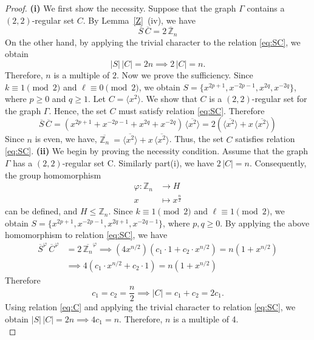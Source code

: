 \documentclass[12pt]{article}
\begin{document}
	\begin{proof}
	 \textbf{(i)} We first show the necessity. Suppose that the graph $\Gamma$ contains a $(2,2)$-regular set $C$. By Lemma~\ref{Z}~(iv), we have
		\begin{equation}\label{eq:SC}
			\overline{S}\, \overline{C} = 2\,\overline{\mathbb{Z}}_n
		\end{equation}
		On the other hand, by applying the trivial character to the relation \eqref{eq:SC}, we obtain
\[
|S|\,|C| = 2n \implies 2\,|C| = n.
\]
Therefore, $n$ is a multiple of $2$. Now we prove the sufficiency. Since
$k \equiv 1 \pmod{2}$ and $\ell \equiv 0 \pmod{2}$, we obtain
$S=\{x^{2p+1},x^{-2p-1},x^{2q},x^{-2q}\}$, where $p \ge 0$ and $q \ge 1$.
Let $C=\langle x^{2}\rangle$. We show that $C$ is a $(2,2)$-regular set for
the graph $\Gamma$. Hence, the set $C$ must satisfy relation \ref{eq:SC}. Therefore
\[
\overline{S}\,\overline{C}
= (x^{2p+1}+x^{-2p-1}+x^{2q}+x^{-2q})\,\overline{\langle x^{2}\rangle}
= 2(\overline{\langle x^{2}\rangle} + x\,\overline{\langle x^{2}\rangle})
\]
Since $n$ is even, we have, $\overline{\mathbb{Z}_n} \ = \overline{\langle x^2 \rangle} + x\,\overline{\langle x^2 \rangle}$. Thus, the set $C$ satisfies relation \eqref{eq:SC}.
 \indent\textbf{(ii)} We begin by proving the necessity condition. Assume that the graph $\Gamma$ has a $(2,2)$-regular set C. Similarly part(i), we have $2\,|C| = n$. Consequently, the group homomorphism
\[
\begin{aligned}
	\varphi : \mathbb{Z}_n &\to H \\
	x &\mapsto x^{\frac{n}{2}}
\end{aligned}
\]
can be defined, and $H \leq \mathbb{Z}_n$. Since
$k \equiv 1 \pmod{2}$ and $\ell \equiv 1 \pmod{2}$, we obtain
$S=\{x^{2p+1},x^{-2p-1},x^{2q+1},x^{-2q-1}\}$, where $p, q \ge 0$. By applying the above homomorphism to relation \eqref{eq:SC}, we have
\[
\begin{aligned}
	\overline{S}^{\varphi}\,\overline{C}^{\varphi}
	&= 2\,\overline{\mathbb{Z}_n}^{\varphi}
	\implies (4 x^{n/2})(c_1 \cdot 1 + c_2 \cdot x^{n/2}) = n (1 + x^{n/2}) \\
	&\implies 4(c_1 \cdot x^{n/2} + c_2 \cdot 1) = n(1 + x^{n/2})
\end{aligned}
\]
Therefore
\begin{equation}\label{eq:C}
	c_1 = c_2 = \frac{n}{2} \implies |C| = c_1 + c_2 = 2c_1.
\end{equation}
	Using relation \eqref{eq:C} and applying the trivial character to relation \eqref{eq:SC}, we obtain $|S|\,|C| = 2n \implies 4 c_1 = n$. Therefore, $n$ is a multiple of 4.\\

\end{proof}
\end{document}

